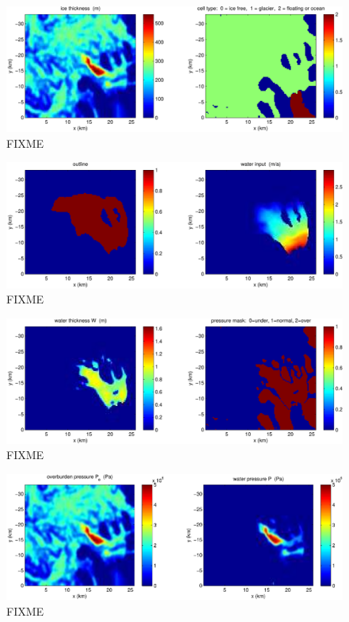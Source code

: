 \documentclass[11pt,final]{amsart}%
\begin{document}
\begin{figure}[ht]
\includegraphics[width=7.0in,keepaspectratio=true]{icethk-icefree-float-250m}
\caption{FIXME}
\end{figure}

\begin{figure}[ht]
\includegraphics[width=7.0in,keepaspectratio=true]{outline-input-250m}
\caption{FIXME}
\end{figure}

\begin{figure}[ht]
\includegraphics[width=7.0in,keepaspectratio=true]{W-Pmask-250m}
\caption{FIXME}
\end{figure}

\begin{figure}[ht]
\includegraphics[width=7.0in,keepaspectratio=true]{Po-P-250m}
\caption{FIXME}
\end{figure}
\end{document}
